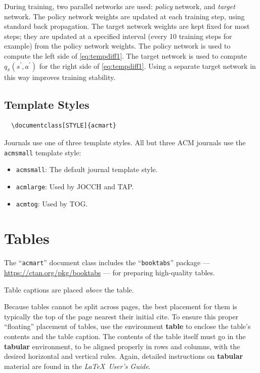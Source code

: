 \documentclass[acmlarge,screen]{acmart}
\begin{document}
During training, two parallel networks are used:  \textit{policy} network, and \textit{target} network.  
The policy network weights are updated at each training step, using standard back propagation.
The target network weights are kept fixed for most steps;  they are updated at a specified interval
(every 10 training steps for example) from the policy network weights.
The policy network is used to compute the left side of \ref{eq:tempdiff1}.  
The target network is used to compute $q_\pi (s^\prime, a^\prime)$ for the right side of \ref{eq:tempdiff1}.  
Using a separate target network in this way improves training stability.



\subsection{Template Styles}


\begin{verbatim}
  \documentclass[STYLE]{acmart}
\end{verbatim}

Journals use one of three template styles. All but three ACM journals use the {\verb|acmsmall|} template style:
\begin{itemize}
\item {\verb|acmsmall|}: The default journal template style.
\item {\verb|acmlarge|}: Used by JOCCH and TAP.
\item {\verb|acmtog|}: Used by TOG.
\end{itemize}


\section{Tables}

The ``\verb|acmart|'' document class includes the ``\verb|booktabs|'' package --- \url{https://ctan.org/pkg/booktabs} --- for preparing high-quality tables. 

Table captions are placed {\it above} the table.

Because tables cannot be split across pages, the best placement for them is typically the top of the page nearest their initial cite.  To ensure this proper ``floating'' placement of tables, use the environment \textbf{table} to enclose the table's contents and the table caption.  The contents of the table itself must go in the \textbf{tabular} environment, to be aligned properly in rows and columns, with the desired horizontal and vertical rules.  Again, detailed instructions on \textbf{tabular} material are found in the \textit{\LaTeX\ User's Guide}.
\end{document}
